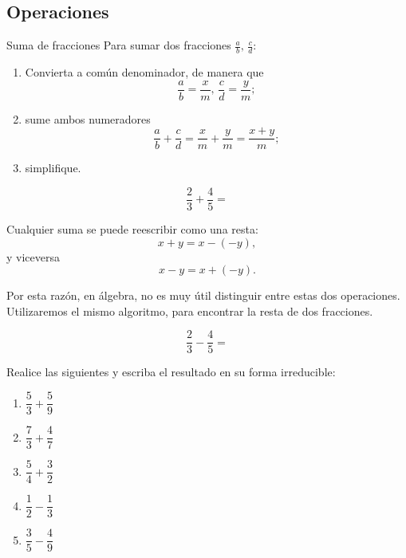 \subsection{Operaciones}


	\begin{algoritmo}{Suma de fracciones}
		Para sumar dos fracciones $\frac{a}{b}, \, \frac{c}{d}:$
		\begin{enumerate}
			\item Convierta a común denominador, de manera que
			$$\dfrac{a}{b}=\dfrac{x}{m}, \, \dfrac{c}{d}=\dfrac{y}{m};$$ 
			\item sume ambos numeradores
			$$
			\dfrac{a}{b}+\dfrac{c}{d}=\dfrac{x}{m}+\frac{y}{m}=\dfrac{x+y}{m};
			$$
			\item simplifique.
		\end{enumerate}
		
	\end{algoritmo}
	




	\begin{problema}
		$$
		\dfrac{2}{3}+\dfrac{4}{5}=%
		$$
	\end{problema}
	



	\begin{observacion}
		Cualquier suma se puede reescribir como una resta:
		$$x+y=x-\left( -y \right),$$ 
		y viceversa
		$$x-y=x+\left( -y \right).$$ 
		
		Por esta raz\'on, en álgebra, no es muy útil distinguir entre estas dos operaciones. Utilizaremos el mismo algoritmo, para encontrar la resta de dos fracciones. 
	\end{observacion}
	




	\begin{problema}
		$$
		\dfrac{2}{3}-\dfrac{4}{5}=%
		$$
	\end{problema}
	



	\begin{problema}
		Realice las siguientes y escriba el resultado en su forma irreducible:
		\begin{enumerate}
			\item $\dfrac{5}{3}+\dfrac{5}{9}$
			\item $\dfrac{7}{3}+\dfrac{4}{7}$
			\item $\dfrac{5}{4}+\dfrac{3}{2}$
			\item $\dfrac{1}{2}-\dfrac{1}{3}$
			\item $\dfrac{3}{5}-\dfrac{4}{9}$
		\end{enumerate}
		
	\end{problema}
	

